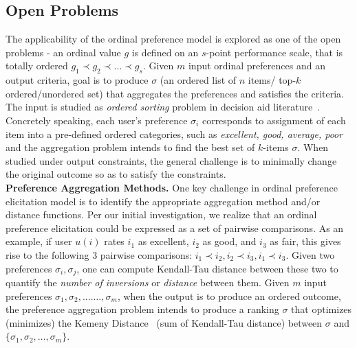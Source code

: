 \documentclass[11pt]{article}
\begin{document}
\subsection{Open Problems}
The applicability of the ordinal preference model is explored as one of the open problems - an ordinal value $g$ is defined on an $s$-point performance scale, that is totally ordered  ${g_1 \prec g_2 \prec \ldots \prec g_s}$. Given $m$ input ordinal preferences and an output criteria, goal is to produce $\sigma$ (an ordered list of $n$ items/ top-$k$ ordered/unordered set) that aggregates the preferences and satisfies the criteria. The input is studied as {\em ordered sorting} problem in decision aid literature~\cite{figueira2005choice}. Concretely speaking, each user's preference $\sigma_i$ corresponds to assignment of each item into a pre-defined ordered categories, such as {\em excellent, good, average, poor} and the aggregation problem intends to find the best set of $k$-items $\sigma$. When studied under output constraints, the general challenge is to minimally change the original outcome so as to satisfy the constraints. \\
{\bf Preference Aggregation Methods.}
One key challenge in ordinal preference elicitation model is to identify the appropriate aggregation method and/or distance functions. Per our initial investigation, we realize that an ordinal preference elicitation  could be expressed as a set of pairwise comparisons. As an example, if user $u(i)$ rates $i_1$ as excellent, $i_2$ as good, and $i_3$ as fair, this gives rise to the following $3$ pairwise comparisons: $i_1 \prec i_2, i_2 \prec i_3, i_1 \prec i_3$. 
Given two preferences $\sigma_i, \sigma_j$, one can compute Kendall-Tau distance between these two to quantify the {\em number of inversions} or {\em distance} between them. Given $m$ input preferences  $\sigma_1,\sigma_2,....\ldots,\sigma_m$, when the output is to produce an ordered outcome, the preference aggregation problem intends to produce a ranking $\sigma$ that optimizes (minimizes) the Kemeny Distance~\cite{wei2022rank} (sum of Kendall-Tau distance) between  $\sigma$ and $\{\sigma_1,\sigma_2,\ldots,\sigma_m\}$. 
\end{document}
